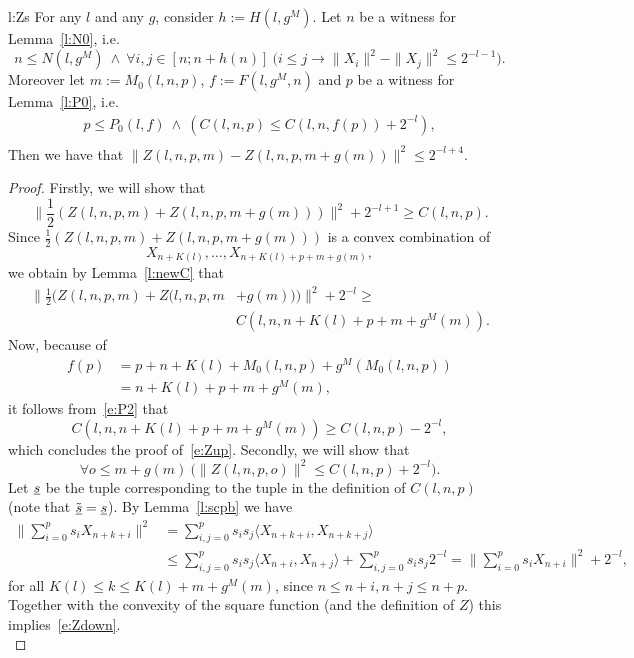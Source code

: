 \begin{lemma*}{l:Zs}
For any $l$ and any $g$, consider $h:= H(l,g^M)$. Let
$n$ be a witness for Lemma~\ref{l:N0}, i.e. 
\[
n\leq N(l,g^M)\ \wedge\ \forall i,j\in[n;n+h(n)]\ 
\big( i\leq j\rightarrow \|X_i\|^2-\|X_j\|^2\leq 2^{-l-1} \big) . \tag{N} \label{e:N2}
\]
Moreover let $m:=M_0(l,n,p)$, $f:=F(l,g^M,n)$ and 
$p$ be a witness for Lemma~\ref{l:P0}, i.e. 
\begin{align*}
p\leq P_0(l,f)\ \wedge\ ( C(l,n,p)\leq C(l,n,f(p)) + 2^{-l}  ),  \tag{P}\label{e:P2}\\
\end{align*} 
Then we have that
$
\|Z(l,n,p,m) - Z( l,n,p,m+g(m) ) \|^2 \leq 2^{-l+4}.
$
\end{lemma*}
\begin{proof}
Firstly, we will show that
\[
\|\frac{1}{2}( Z(l,n,p,m) + Z( l,n,p,m+g(m) )  )\|^2 + 2^{-l+1} \geq C(l,n,p). \tag{1}\label{e:Zup}
\]
Since $\frac{1}{2}( Z(l,n,p,m) + Z( l,n,p,m+g(m) )  )$ is a convex
combination of \[ X_{n+K(l)},\ldots,X_{n+K(l)+p+m+g(m)},\] 
we obtain by Lemma~\ref{l:newC} that
\begin{align*}
\Big\|\frac{1}{2}( Z(l,n,p,m) + Z( l,n,p,m&+g(m) )  )\Big\|^2 + 2^{-l} \geq\\ &C( l,n,n+K(l)+p+m+g^M(m) ). 
\end{align*}
Now, because of 
\begin{align*}
f(p)&=p+n+K(l)+M_0(l,n,p)+g^M(M_0(l,n,p))\\&=n+K(l)+p+m+g^M(m), 
\end{align*}
it follows from~\eqref{e:P2} that
\[
 C( l,n,n+K(l)+p+m+g^M(m) ) \geq  C(l,n,p) - 2^{-l}, %
\]
which concludes the proof of~\eqref{e:Zup}.
Secondly, we will show that \[
\forall o\leq m+g(m)\ \big( \big\| Z( l,n,p,o ) \big\|^2\leq C(l,n,p) + 2^{-l} \big). \tag{2}\label{e:Zdown}
\] 
Let $\underline s$ be the tuple corresponding to the tuple in the definition of $C(l,n,p)$ (note that $\tilde{\underline s}=\underline s$).
By Lemma~\ref{l:scpb} we have
\begin{align*}
\bigg\|\sum^{p}_{i=0} s_i X_{n+k+i}\bigg\|^2&=\sum^{p}_{i,j=0}  s_i s_j \langle X_{n+k+i},X_{n+k+j} \rangle \\
&\leq \sum^{p}_{i,j=0}  s_i s_j \langle X_{n+i},X_{n+j} \rangle + \sum^{p}_{i,j=0}  s_i s_j 2^{-l}=\bigg\|\sum^{p}_{i=0} s_i X_{n+i}\bigg\|^2+2^{-l},
\end{align*}
for all $K(l)\leq k \leq K(l)+m+g^M(m)$, since $n\leq n+i,n+j\leq n+p$. Together with the convexity of the square function (and the definition of $Z$) this implies~\eqref{e:Zdown}.\\

\end{proof}
